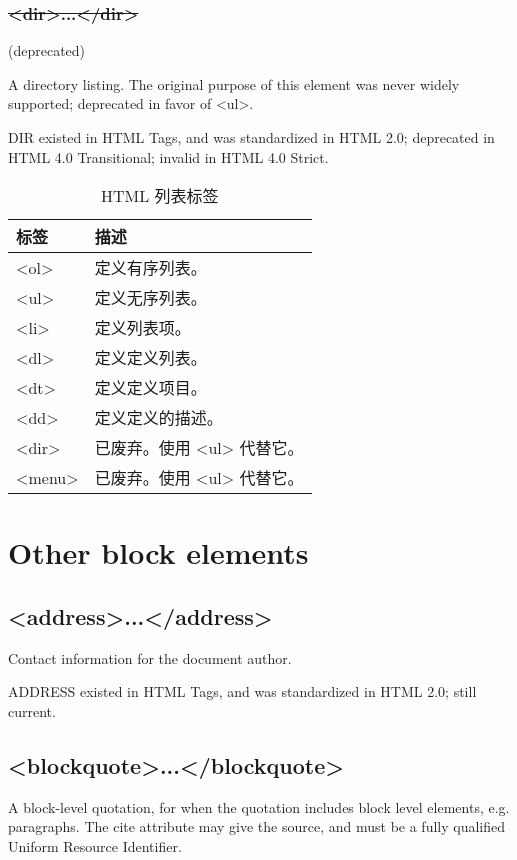 \subsubsection{\sout{<dir>...</dir>}}

(deprecated)


A directory listing. The original purpose of this element was never widely supported; deprecated in favor of <ul>.

DIR existed in HTML Tags, and was standardized in HTML 2.0; deprecated in HTML 4.0 Transitional; invalid in HTML 4.0 Strict.


\begin{table}[!h]
\centering
\caption{HTML 列表标签}
\begin{tabular}{|l|l|}
\hline
标签		&	描述\\
\hline
<ol>		&	定义有序列表。\\
\hline
<ul>		&	定义无序列表。\\
\hline
<li>		&	定义列表项。\\
\hline
<dl>		&	定义定义列表。\\
\hline
<dt>		&	定义定义项目。\\
\hline
<dd>	&	定义定义的描述。\\
\hline
<dir>	&	已废弃。使用 <ul> 代替它。\\
\hline
<menu>	&	已废弃。使用 <ul> 代替它。\\
\hline
\end{tabular}
\end{table}


\section{Other block elements}




\subsection{<address>...</address>}



Contact information for the document author.

ADDRESS existed in HTML Tags, and was standardized in HTML 2.0; still current.


\subsection{<blockquote>...</blockquote>}


A block-level quotation, for when the quotation includes block level elements, e.g. paragraphs. The cite attribute may give the source, and must be a fully qualified Uniform Resource Identifier.

